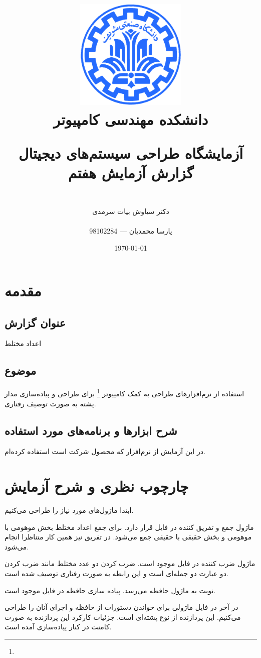 \documentclass[fleqn]{article}
\title{
\includegraphics[width=0.4\textwidth]{sharif.png}\\
\normalsize{دانشکده مهندسی کامپیوتر}\\
\vspace{1cm}
	
\huge{آزمایشگاه طراحی سیستم‌های دیجیتال}
\\
\Large{گزارش آزمایش هفتم}
\\
}
\author{
\\
دکتر سیاوش بیات سرمدی
\\
\\
پارسا محمدیان --- 98102284
}
\date{\today}
\begin{document}
\clearpage\maketitle
\thispagestyle{empty}

\newpage

\pagestyle{fancy}



\tableofcontents

\setcounter{page}{1}

\newpage

\section{مقدمه}

\subsection*{عنوان گزارش}
 اعداد مختلط
\subsection*{موضوع}
استفاده از نرم‌افزارهای طراحی به کمک کامپیوتر \footnote{} برای طراحی 
و پیاده‌سازی مدار پشته به صورت توصیف رفتاری.
\subsection*{شرح ابزارها و برنامه‌های مورد استفاده}
در این آزمایش از نرم‌افزار  که محصول شرکت  است 
استفاده کرده‌ام.

\section{چارچوب نظری و شرح آزمایش}
ابتدا ماژول‌های مورد نیاز را طراحی می‌کنیم. 

ماژول جمع و تفریق کننده در فایل 
قرار دارد. برای جمع اعداد مختلط بخش موهومی با موهومی و بخش حقیقی با حقیقی جمع می‌شود. در تفریق نیز 
همین کار متناظرا انجام می‌شود. 

ماژول ضرب کننده در فایل 
موجود است. ضرب کردن دو عدد مختلط مانند ضرب کردن دو عبارت دو جمله‌ای است و این رابطه به صورت رفتاری توصیف شده است.

نوبت به ماژول حافظه می‌رسد. پیاده سازی حافظه در فایل 
موجود است.

در آخر در فایل 
ماژولی برای خواندن دستورات از حافظه و اجرای آنان را طراحی می‌کنیم. این پردازنده از نوع پشته‌ای است. جزئیات کارکرد این 
پردازنده به صورت کامنت در کنار پیاده‌سازی آمده است.
\end{document}
